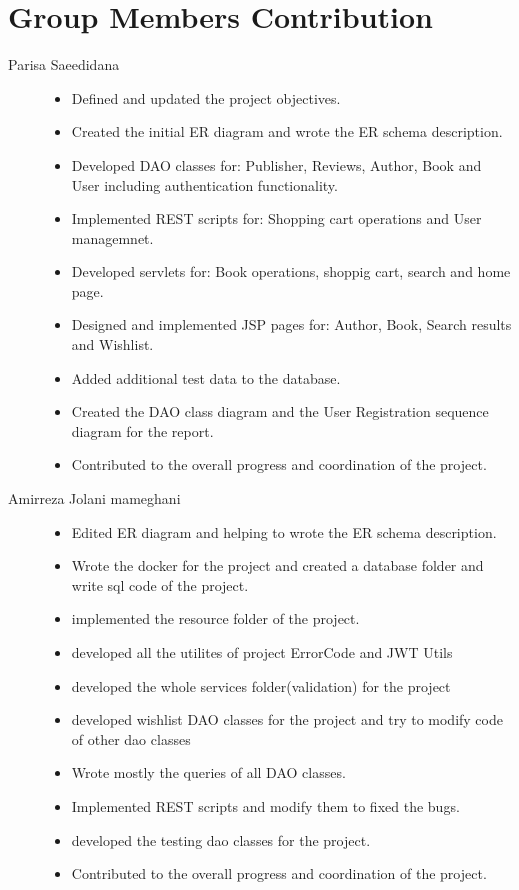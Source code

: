 \section{Group Members Contribution}


\begin{description}
	\item[Parisa Saeedidana]
	    \begin{itemize}
		\item Defined and updated the project objectives.
		\item Created the initial ER diagram and wrote the ER schema description.
		\item Developed DAO classes for: Publisher, Reviews, Author, Book and User including authentication functionality.
		\item Implemented REST scripts for: Shopping cart operations and User managemnet.
		\item Developed servlets for: Book operations, shoppig cart, search and home page.
		\item Designed and implemented JSP pages for: Author, Book, Search results and Wishlist.
		\item Added additional test data to the database.
		\item Created the DAO class diagram and the User Registration sequence diagram for the report.
		\item Contributed to the overall progress and coordination of the project.
		\end{itemize}

	\item[Amirreza Jolani mameghani] 	    
	\begin{itemize}
		\item Edited ER diagram and helping to wrote the ER schema description.
		\item Wrote the docker for the project and created a database folder and write sql code of the project.
		\item implemented the resource folder of the project.
		\item developed all the utilites of project ErrorCode and JWT Utils
		\item developed the whole services folder(validation) for the project
		\item developed wishlist DAO classes for the project and try to modify code of other dao classes
		\item Wrote mostly the queries of all DAO classes.
		\item Implemented REST scripts and modify them to fixed the bugs.
		\item developed the testing dao classes for the project.
		\item Contributed to the overall progress and coordination of the project.
	\end{itemize}


\end{description}
